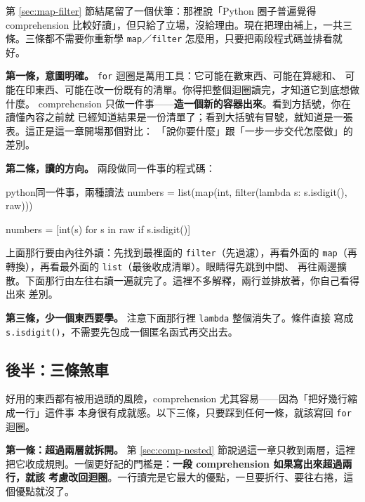 第 \ref{sec:map-filter} 節結尾留了一個伏筆：那裡說「Python 圈子普遍覺得 comprehension
比較好讀」，但只給了立場，沒給理由。現在把理由補上，一共三條。三條都不需要你重新學
\texttt{map}／\texttt{filter} 怎麼用，只要把兩段程式碼並排看就好。

\textbf{第一條，意圖明確。} \texttt{for} 迴圈是萬用工具：它可能在數東西、可能在算總和、
可能在印東西、可能在改一份既有的清單。你得把整個迴圈讀完，才知道它到底想做什麼。
comprehension 只做一件事——\textbf{造一個新的容器出來}。看到方括號，你在讀懂內容之前就
已經知道結果是一份清單了；看到大括號有冒號，就知道是一張表。這正是這一章開場那個對比：
「說你要什麼」跟「一步一步交代怎麼做」的差別。

\textbf{第二條，讀的方向。} 兩段做同一件事的程式碼：

\begin{code}{python}{同一件事，兩種讀法}
numbers = list(map(int, filter(lambda s: s.isdigit(), raw)))

numbers = [int(s) for s in raw if s.isdigit()]
\end{code}

上面那行要由內往外讀：先找到最裡面的 \texttt{filter}（先過濾），再看外面的
\texttt{map}（再轉換），再看最外面的 \texttt{list}（最後收成清單）。眼睛得先跳到中間、
再往兩邊擴散。下面那行由左往右讀一遍就完了。這裡不多解釋，兩行並排放著，你自己看得出來
差別。

\textbf{第三條，少一個東西要學。} 注意下面那行裡 \texttt{lambda} 整個消失了。條件直接
寫成 \texttt{s.isdigit()}，不需要先包成一個匿名函式再交出去。


\subsection*{後半：三條煞車}

好用的東西都有被用過頭的風險，comprehension 尤其容易——因為「把好幾行縮成一行」這件事
本身很有成就感。以下三條，只要踩到任何一條，就該寫回 \texttt{for} 迴圈。

\textbf{第一條：超過兩層就拆開。} 第 \ref{sec:comp-nested} 節說過這一章只教到兩層，這裡
把它收成規則。一個更好記的門檻是：\textbf{一段 comprehension 如果寫出來超過兩行，就該
考慮改回迴圈}。一行讀完是它最大的優點，一旦要折行、要往右捲，這個優點就沒了。

